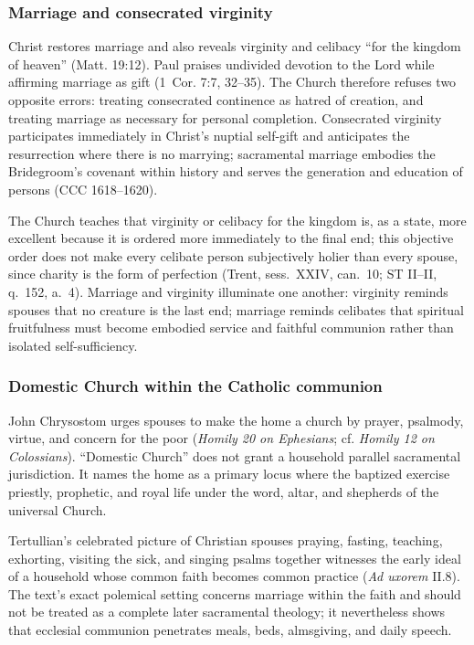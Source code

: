 \subsubsection{Marriage and consecrated virginity}

Christ restores marriage and also reveals virginity and celibacy ``for the kingdom of heaven'' (Matt. 19:12). Paul praises undivided devotion to the Lord while affirming marriage as gift (1~Cor. 7:7, 32--35). The Church therefore refuses two opposite errors: treating consecrated continence as hatred of creation, and treating marriage as necessary for personal completion. Consecrated virginity participates immediately in Christ's nuptial self-gift and anticipates the resurrection where there is no marrying; sacramental marriage embodies the Bridegroom's covenant within history and serves the generation and education of persons (CCC 1618--1620).

The Church teaches that virginity or celibacy for the kingdom is, as a state, more excellent because it is ordered more immediately to the final end; this objective order does not make every celibate person subjectively holier than every spouse, since charity is the form of perfection (Trent, sess.~XXIV, can.~10; ST II--II, q.~152, a.~4). Marriage and virginity illuminate one another: virginity reminds spouses that no creature is the last end; marriage reminds celibates that spiritual fruitfulness must become embodied service and faithful communion rather than isolated self-sufficiency.

\subsubsection{Domestic Church within the Catholic communion}

John Chrysostom urges spouses to make the home a church by prayer, psalmody, virtue, and concern for the poor (\emph{Homily 20 on Ephesians}; cf. \emph{Homily 12 on Colossians}). ``Domestic Church'' does not grant a household parallel sacramental jurisdiction. It names the home as a primary locus where the baptized exercise priestly, prophetic, and royal life under the word, altar, and shepherds of the universal Church.

Tertullian's celebrated picture of Christian spouses praying, fasting, teaching, exhorting, visiting the sick, and singing psalms together witnesses the early ideal of a household whose common faith becomes common practice (\emph{Ad uxorem} II.8). The text's exact polemical setting concerns marriage within the faith and should not be treated as a complete later sacramental theology; it nevertheless shows that ecclesial communion penetrates meals, beds, almsgiving, and daily speech.

